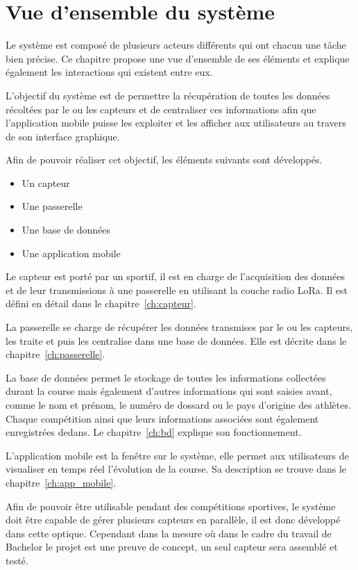 
\chapter{Vue d'ensemble du système}\label{ch:systeme}

Le système est composé de plusieurs acteurs différents qui ont chacun une tâche bien précise. Ce chapitre propose une vue d'ensemble de ses éléments et explique également les interactions qui existent entre eux.

L'objectif du système est de permettre la récupération de toutes les données récoltées par le ou les capteurs et de centraliser ces informations afin que l'application mobile puisse les exploiter et les afficher aux utilisateurs au travers de son interface graphique.

Afin de pouvoir réaliser cet objectif, les éléments suivants sont développés.

\begin{itemize}
\item Un capteur
\item Une passerelle
\item Une base de données
\item Une application mobile
\end{itemize}

Le capteur est porté par un sportif, il est en charge de l'acquisition des données et de leur transmissions à une passerelle en utilisant la couche radio LoRa. Il est défini en détail dans le chapitre~\ref{ch:capteur}.

La passerelle se charge de récupérer les données transmises par le ou les capteurs, les traite et puis les centralise dans une base de données. Elle est décrite dans le chapitre~\ref{ch:passerelle}.

La base de données permet le stockage de toutes les informations collectées durant la course mais également d'autres informations qui sont saisies avant, comme le nom et prénom, le numéro de dossard ou le pays d'origine des athlètes. Chaque compétition ainsi que leurs informations associées sont également enregistrées dedans. Le chapitre~\ref{ch:bd} explique son fonctionnement.

L'application mobile est la fenêtre sur le système, elle permet aux utilisateurs de visualiser en temps réel l'évolution de la course. Sa description se trouve dans le chapitre~\ref{ch:app_mobile}.

Afin de pouvoir être utilisable pendant des compétitions sportives, le système doit être capable de gérer plusieurs capteurs en parallèle, il est donc développé dans cette optique. Cependant dans la mesure où dans le cadre du travail de Bachelor le projet est une preuve de concept, un seul capteur sera assemblé et testé. 

